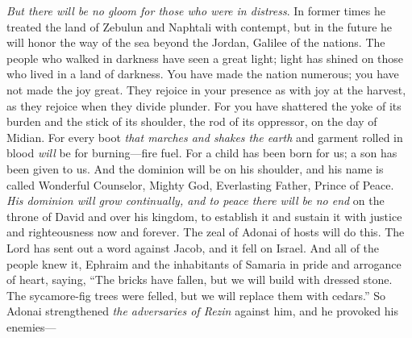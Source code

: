 \begin{biblechapter} %
  \textit{But there will be no gloom for those who were in distress}. In former times he treated the land of Zebulun and Naphtali with contempt, but in the future he will honor the way of the sea beyond the Jordan, Galilee of the nations.
\verse The people who walked in darkness have seen a great light; 
light has shined on those who lived in a land of darkness.
\verse You have made the nation numerous; 
you have not made the joy great. 
They rejoice in your presence as with joy at the harvest, 
as they rejoice when they divide plunder.
\verse For you have shattered the yoke of its burden 
and the stick of its shoulder, 
the rod of its oppressor, on the day of Midian.
\verse For every boot \textit{that marches and shakes the earth} 
and garment rolled in blood 
\textit{will} be for burning—fire fuel.
\verse For a child has been born for us; 
a son has been given to us. 
And the dominion will be on his shoulder, 
and his name is called Wonderful Counselor, Mighty God, 
Everlasting Father, Prince of Peace.
\verse \textit{His dominion will grow continually, 
and to peace there will be no end} 
on the throne of David and over his kingdom, 
to establish it and sustain it 
with justice and righteousness 
now and forever. 
The zeal of Adonai of hosts will do this.
 The Lord has sent out a word against Jacob, 
and it fell on Israel.
\verse And all of the people knew it, 
Ephraim and the inhabitants of Samaria 
in pride and arrogance of heart, saying,
\verse “The bricks have fallen, but we will build with dressed stone. 
The sycamore-fig trees were felled, but we will replace them with cedars.”
\verse So Adonai strengthened \textit{the adversaries of Rezin} against him, 
and he provoked his enemies—

\end{biblechapter}
